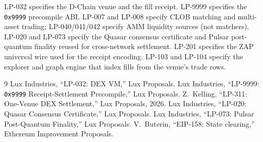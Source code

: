 \documentclass[11pt,a4paper]{article}
\begin{document}
LP-032 specifies the D-Chain venue and the fill receipt. LP-9999 specifies the \texttt{0x9999}
precompile ABI. LP-007 and LP-008 specify CLOB matching and multi-asset trading; LP-040/041/042
specify AMM liquidity sources (not matchers). LP-020 and LP-073 specify the Quasar consensus
certificate and Pulsar post-quantum finality reused for cross-network settlement. LP-201 specifies
the ZAP universal wire used for the receipt encoding. LP-103 and LP-104 specify the explorer and
graph engine that index fills from the venue's trade rows.

\begin{thebibliography}{9}
 Lux Industries, ``LP-032: DEX VM,'' Lux Proposals.
 Lux Industries, ``LP-9999: \texttt{0x9999} Receipt-Settlement Precompile,'' Lux Proposals.
 Z.~Kelling, ``LP-311: One-Venue DEX Settlement,'' Lux Proposals, 2026.
 Lux Industries, ``LP-020: Quasar Consensus Certificate,'' Lux Proposals.
 Lux Industries, ``LP-073: Pulsar Post-Quantum Finality,'' Lux Proposals.
 V.~Buterin, ``EIP-158: State clearing,'' Ethereum Improvement Proposals.
\end{thebibliography}
\end{document}
